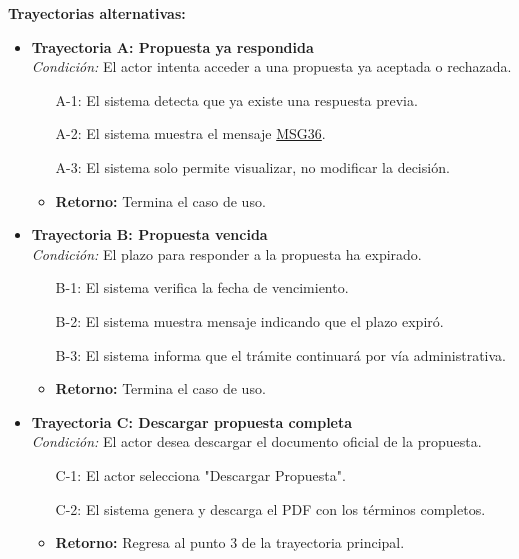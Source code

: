 \begin{appendices}
\textbf{Trayectorias alternativas:}
\begin{itemize}[leftmargin=*]
    \item \textbf{Trayectoria A: Propuesta ya respondida} \\
    \textit{Condición:} El actor intenta acceder a una propuesta ya aceptada o rechazada.
    \begin{itemize}[nosep]
        \item[A-1:] El sistema detecta que ya existe una respuesta previa.
        \item[A-2:] El sistema muestra el mensaje \hyperlink{msg:MSG36}{MSG36}.
        \item[A-3:] El sistema solo permite visualizar, no modificar la decisión.
        \item \textbf{Retorno:} Termina el caso de uso.
    \end{itemize}
    \item \textbf{Trayectoria B: Propuesta vencida} \\
    \textit{Condición:} El plazo para responder a la propuesta ha expirado.
    \begin{itemize}[nosep]
        \item[B-1:] El sistema verifica la fecha de vencimiento.
        \item[B-2:] El sistema muestra mensaje indicando que el plazo expiró.
        \item[B-3:] El sistema informa que el trámite continuará por vía administrativa.
        \item \textbf{Retorno:} Termina el caso de uso.
    \end{itemize}
    \item \textbf{Trayectoria C: Descargar propuesta completa} \\
    \textit{Condición:} El actor desea descargar el documento oficial de la propuesta.
    \begin{itemize}[nosep]
        \item[C-1:] El actor selecciona "Descargar Propuesta".
        \item[C-2:] El sistema genera y descarga el PDF con los términos completos.
        \item \textbf{Retorno:} Regresa al punto 3 de la trayectoria principal.
    \end{itemize}
\end{itemize}

\newpage


\end{appendices}
